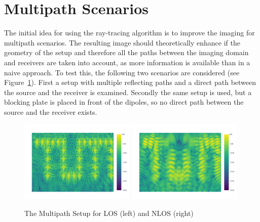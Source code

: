 \section{Multipath Scenarios}
The initial idea for using the ray-tracing algorithm is to improve the imaging for multipath scenarios.
The resulting image should theoretically enhance if the geometry of the setup and therefore all the paths between the imaging domain and receivers are taken into account, as more information is available than in a naive approach.
To test this, the following two scenarios are considered (see Figure~\ref{fig:MultipathNLOS_setup}).
First a setup with multiple reflecting paths and a direct path between the source and the receiver is examined.
Secondly the same setup is used, but a blocking plate is placed in front of the dipoles, so no direct path between the source and the receiver exists.


\begin{figure}[p]
    \centering
    \includegraphics[page=3, width=0.49\textwidth]{figures/multipath_los_combined.pdf}
    \includegraphics[page=3, width=0.49\textwidth]{figures/multipath_nlos_combined.pdf}
    \caption{The Multipath Setup for LOS (left) and NLOS (right)}\label{fig:MultipathNLOS_setup}
\end{figure}

